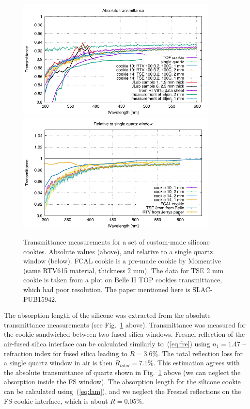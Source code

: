 \begin{figure}[!tb]
\centering
\includegraphics[angle=0,width=0.9\textwidth]{pics/transmittance1.pdf} \\
\includegraphics[angle=0,width=0.9\textwidth]{pics/cookie10_relQuartz.pdf}
\caption{\label{pic:coo}
Transmittance measurements for a set of custom-made silicone cookies. Absolute values (above), and relative to a single quartz window  (below). FCAL cookie is a pre-made cookie by Momentive (same RTV615 material, thickness $2$ mm). The data for TSE 2 mm cookie is taken from a plot on Belle II TOP cookies transmittance, which had poor resolution. The paper mentioned here is SLAC-PUB15942.
}
\end{figure}

The absorption length of the silicone was extracted from the absolute transmittance measurements (see Fig.~\ref{pic:coo} above). Transmittance was measured for the cookie sandwiched between two fused silica windows. Fresnel reflection of the air-fused silica interface can be calculated similarly to~(\ref{eq:fre}) using $n_1 = 1.47$ -- refraction index for fused silica leading to $R = 3.6 \%$. The total reflection loss for a single quartz window in air is then $R_{total} = 7.1 \%$. This estimation agrees with the absolute transmittance of quartz shown in Fig.~\ref{pic:coo} above (we can neglect the absorption inside the FS window). The absorption length for the silicone cookie can be calculated using~(\ref{eq:lam}), and we neglect the Fresnel reflections on the FS-cookie interface, which is about $R = 0.05 \%$.

